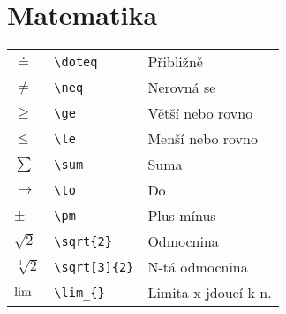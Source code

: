 \documentclass[main.tex]{subfiles}
\begin{document}
\section*{Matematika}
\begin{tabular}{ p{2em} p{7.5em} l }
  $\doteq$			&	\verb|\doteq|				&	Přibližně							\\
  $\neq$				&	\verb|\neq|					&	Nerovná se						\\
  $\ge$					&	\verb|\ge|					&	Větší nebo rovno			\\
  $\le$					&	\verb|\le|					&	Menší nebo rovno			\\
  $\sum$				&	\verb|\sum|					&	Suma									\\
  $\to$					&	\verb|\to|					&	Do										\\
  $\pm$					&	\verb|\pm|					&	Plus mínus						\\
  $\sqrt{2}$		&	\verb|\sqrt{2}|			&	Odmocnina							\\
  $\sqrt[3]{2}$	&	\verb|\sqrt[3]{2}|	&	N-tá odmocnina				\\
  $\displaystyle\lim$				&	\verb|\lim_{}|			&	Limita x jdoucí k n.	\\
\end{tabular}
\end{document}
